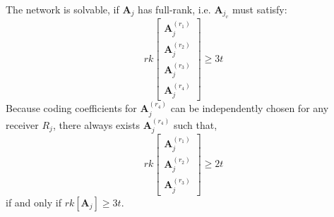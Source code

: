 The network is solvable, if $\boldsymbol{A}_{j}$ has full-rank, i.e.
$\boldsymbol{A}_{j_{v}}$ must satisfy:
\[
rk\left[\begin{array}{c}
\boldsymbol{A}_{j}^{\left(r_{1}\right)}\\
\boldsymbol{A}_{j}^{\left(r_{2}\right)}\\
\boldsymbol{A}_{j}^{\left(r_{3}\right)}\\
\boldsymbol{A}_{j}^{\left(r_{4}\right)}
\end{array}\right]\geq3t
\]
Because coding coefficients for $\boldsymbol{A}_{j}^{\left(r_{4}\right)}$
can be independently chosen for any receiver $R_{j}$, there always
exists $\boldsymbol{A}_{j}^{\left(r_{4}\right)}$ such that,
\begin{equation}
rk\left[\begin{array}{c}
\boldsymbol{A}_{j}^{\left(r_{1}\right)}\\
\boldsymbol{A}_{j}^{\left(r_{2}\right)}\\
\boldsymbol{A}_{j}^{\left(r_{3}\right)}
\end{array}\right]\geq2t\label{eq:rk_rqm_e1l1h3s4}
\end{equation}
if and only if $rk\left[\boldsymbol{A}_{j}\right]\geq3t$.

